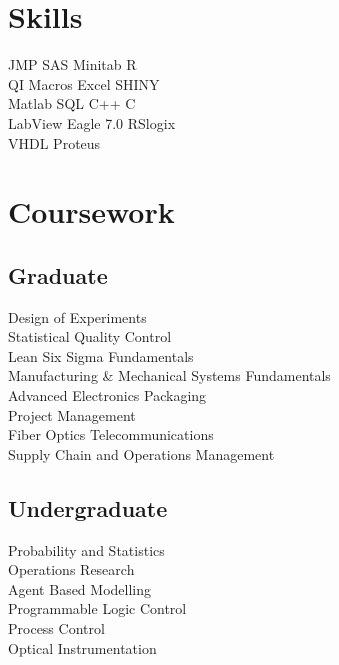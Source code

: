 \documentclass[]{bigfatnoob-resume}
\begin{document}
\begin{minipage}[t]{0.33\textwidth}
		
		\section{Skills}
		JMP SAS \textbullet{} Minitab \textbullet{} R \\ 
		QI Macros \textbullet{} Excel \textbullet{} SHINY \\
		Matlab \textbullet{} SQL \textbullet{} C++ \textbullet{} C\\
		LabView \textbullet{} Eagle 7.0 \textbullet{} RSlogix \\
		VHDL \textbullet{} Proteus
		\sectionsep
		
		
		\section{Coursework}
		\subsection{Graduate}
		Design of Experiments \\
		Statistical Quality Control\\
		Lean Six Sigma Fundamentals \\
		Manufacturing \& Mechanical Systems Fundamentals\\
		Advanced Electronics Packaging \\
		Project Management \\
		Fiber Optics Telecommunications \\
		Supply Chain and Operations Management \\
		
		
		
		\sectionsep
		
		\subsection{Undergraduate}
		Probability and Statistics\\
		Operations Research \\
		Agent Based Modelling \\
		Programmable Logic Control \\
		Process Control\\
		Optical Instrumentation\\
		
		\sectionsep
		
		
	\end{minipage} 
\end{document}

